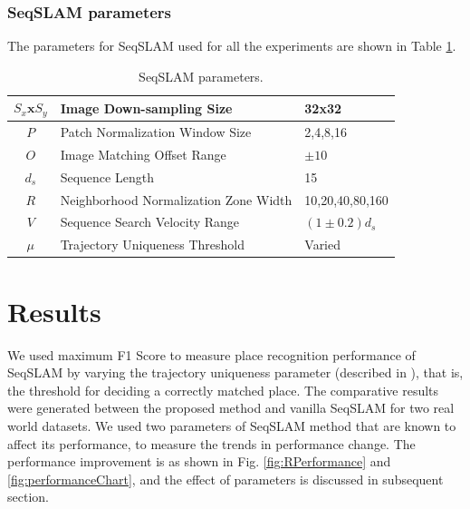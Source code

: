 \documentclass[letterpaper, 10 pt, conference]{ieeeconf}  %
\begin{document}
\subsubsection{SeqSLAM parameters}
The parameters for SeqSLAM used for all the experiments are shown in Table \ref{table:seqSLAMParams}.

\begin{table}[!h]
	\caption{SeqSLAM parameters.}
	\begin{tabular}{|c|p{4cm}|p{2.5cm}|}
		\hline
		$S_x\mathbf{x}S_y$ & Image Down-sampling Size & 32x32 \\
		\hline
		$P$ & Patch Normalization Window Size & {2,4,8,16} \\
		\hline
		$O$ & Image Matching Offset Range & $\pm10$ \\
		\hline
		$d_s$ & Sequence Length & 15 \\
		\hline
		$R$ & Neighborhood Normalization Zone Width & {10,20,40,80,160} \\
		\hline
		$V$ & Sequence Search Velocity Range & $(1\pm0.2)d_s$ \\
		\hline
		$\mu$ & Trajectory Uniqueness Threshold & Varied \\
		\hline
	\end{tabular}
	\label{table:seqSLAMParams}
\end{table}

\section{Results}
We used maximum F1 Score to measure place recognition performance of SeqSLAM by varying the trajectory uniqueness parameter (described in \cite{Milford2012}), that is, the threshold for deciding a correctly matched place. The comparative results were generated between the proposed method and vanilla SeqSLAM for two real world datasets. We used two parameters of SeqSLAM method that are known to affect its performance, to measure the trends in performance change. The performance improvement is as shown in Fig. \ref{fig:RPerformance} and \ref{fig:performanceChart}, and the effect of parameters is discussed in subsequent section. 
\end{document}
